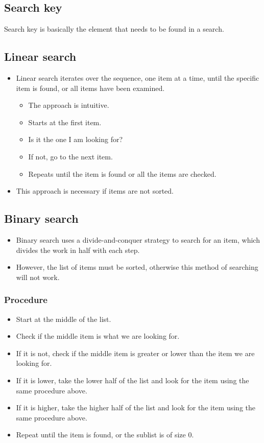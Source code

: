 \documentclass[11pt]{article}
\begin{document}
\subsection{Search key}
\label{sec:org1cf4496}
Search key is basically the element that needs to be found in a search.
\subsection{Linear search}
\label{sec:org3475869}
\begin{itemize}
\item Linear search iterates over the sequence, one item at a time, until the specific item is found, or all items have been examined.
\begin{itemize}
\item The approach is intuitive.
\item Starts at the first item.
\item Is it the one I am looking for?
\item If not, go to the next item.
\item Repeats until the item is found or all the items are checked.
\end{itemize}

\item This approach is necessary if items are not sorted.
\end{itemize}

 \newpage
\subsection{Binary search}
\label{sec:orgf59148c}
\begin{itemize}
\item Binary search uses a divide-and-conquer strategy to search for an item, which divides the work in half with each step.
\item However, the list of items must be sorted, otherwise this method of searching will not work.
\end{itemize}
\subsubsection{Procedure}
\label{sec:orgc44549c}
\begin{itemize}
\item Start at the middle of the list.
\item Check if the middle item is what we are looking for.
\item If it is not, check if the middle item is greater or lower than the item we are looking for.
\item If it is lower, take the lower half of the list and look for the item using the same procedure above.
\item If it is higher, take the higher half of the list and look for the item using the same procedure above.
\item Repeat until the item is found, or the sublist is of size 0.
\end{itemize}
\end{document}
